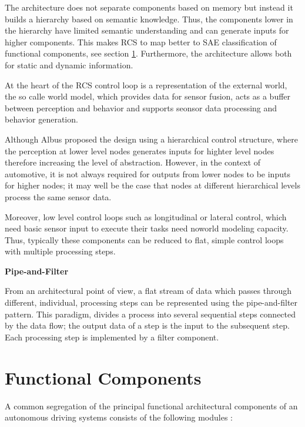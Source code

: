 The architecture does not separate components based on memory but instead it builds a hierarchy based on semantic knowledge. Thus, the components
lower in the hierarchy have limited semantic understanding and can generate inputs for higher components. This makes RCS to map better to SAE classification of 
functional components, see section \ref{functional_components}. Furthermore, the architecture allows both for static and dynamic information.

At the heart of the RCS control loop is a representation of the external world, the so calle world model, which provides data for sensor fusion, acts as a 
buffer between perception and behavior and supports seonsor data processing and behavior generation.

Although Albus proposed the design using a hierarchical control structure, where the perception at lower level nodes generates inputs for highter 
level nodes therefore increasing the level of abstraction. However, in the context of automotive, it is not always required for outputs from lower nodes to
be inputs for higher nodes; it may well be the case that nodes at different hierarchical levels process the same sensor data.  

Moreover, low level control loops such as longitudinal or lateral control, which need basic sensor input to execute their tasks need noworld modeling capacity. Thus, typically these
components can be reduced to flat, simple control loops with multiple processing steps. 


\begin{framed}

\textbf{Pipe-and-Filter}

From an architectural point of view, a flat stream of data which passes through different, individual, processing steps can be represented using the pipe-and-filter pattern. 
This paradigm, divides a process into several sequential steps connected by the data flow; the output data of a step is the input to the 
subsequent step. Each processing step is implemented by a filter component.  


\end{framed}

\section{Functional Components}
\label{functional_components}

A common segregation of the principal functional architectural components of an autonomous driving systems consists of the following modules \cite{Bahere}:

